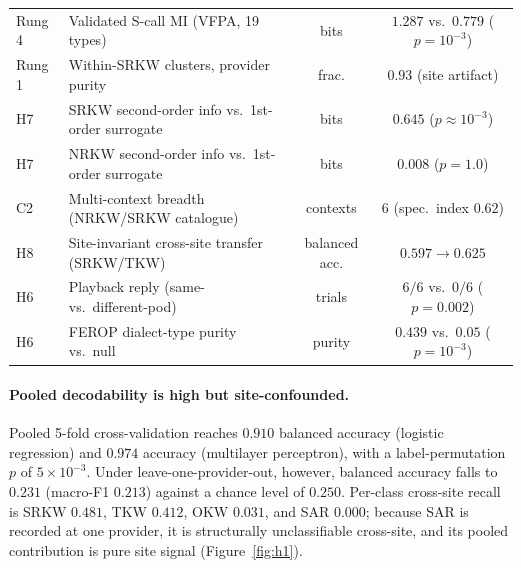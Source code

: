 \documentclass[11pt]{article}
\begin{document}
\begin{table}[t]
\begin{tabular}{llcc}
Rung 4 & Validated S-call MI (VFPA, 19 types) & bits & $1.287$ vs.\ $0.779$ ($p=10^{-3}$) \\
Rung 1 & Within-SRKW clusters, provider purity & frac. & $0.93$ (site artifact) \\
H7 & SRKW second-order info vs.\ 1st-order surrogate & bits & $0.645$ ($p\approx10^{-3}$) \\
H7 & NRKW second-order info vs.\ 1st-order surrogate & bits & $0.008$ ($p=1.0$) \\
C2 & Multi-context breadth (NRKW/SRKW catalogue) & contexts & $6$ (spec.\ index $0.62$) \\
H8 & Site-invariant cross-site transfer (SRKW/TKW) & balanced acc. & $0.597{\to}0.625$ \\
H6 & Playback reply (same- vs.\ different-pod) & trials & $6/6$ vs.\ $0/6$ ($p=0.002$) \\
H6 & FEROP dialect-type purity vs.\ null & purity & $0.439$ vs.\ $0.05$ ($p=10^{-3}$) \\
\bottomrule
\end{tabular}
\end{table}

\paragraph{Pooled decodability is high but site-confounded.} Pooled 5-fold cross-validation
reaches $0.910$ balanced accuracy (logistic regression) and $0.974$ accuracy
(multilayer perceptron), with a label-permutation $p$ of $5\times10^{-3}$. Under
leave-one-provider-out, however, balanced accuracy falls to $0.231$ (macro-F1 $0.213$)
against a chance level of $0.250$. Per-class cross-site recall is SRKW $0.481$, TKW $0.412$,
OKW $0.031$, and SAR $0.000$; because SAR is recorded at one provider, it is structurally
unclassifiable cross-site, and its pooled contribution is pure site signal
(Figure~\ref{fig:h1}).
\end{document}
